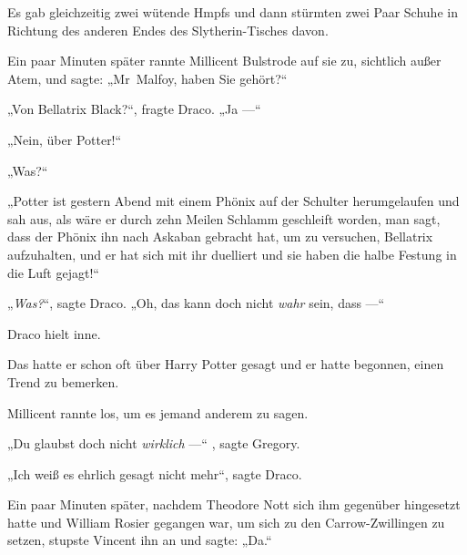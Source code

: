 Es gab gleichzeitig zwei wütende Hmpfs und dann stürmten zwei Paar Schuhe in Richtung des anderen Endes des Slytherin-Tisches davon.

Ein paar Minuten später rannte Millicent Bulstrode auf sie zu, sichtlich außer Atem, und sagte:
„Mr~Malfoy, haben Sie gehört?“

„Von Bellatrix Black?“, fragte Draco.
„Ja —“

„Nein, über Potter!“

„Was?“

„Potter ist gestern Abend mit einem Phönix auf der Schulter herumgelaufen und sah aus, als wäre er durch zehn Meilen Schlamm geschleift worden, man sagt, dass der Phönix ihn nach Askaban gebracht hat, um zu versuchen, Bellatrix aufzuhalten, und er hat sich mit ihr duelliert und sie haben die halbe Festung in die Luft gejagt!“

„\emph{Was?}“, sagte Draco.
„Oh, das kann doch nicht \emph{wahr} sein, dass —“

Draco hielt inne.

Das hatte er schon oft über Harry Potter gesagt und er hatte begonnen, einen Trend zu bemerken.

Millicent rannte los, um es jemand anderem zu sagen.

„Du glaubst doch nicht \emph{wirklich} —“ , sagte Gregory.

„Ich weiß es ehrlich gesagt nicht mehr“, sagte Draco.

Ein paar Minuten später, nachdem Theodore Nott sich ihm gegenüber hingesetzt hatte und William Rosier gegangen war, um sich zu den Carrow-Zwillingen zu setzen, stupste Vincent ihn an und sagte:
„Da.“

